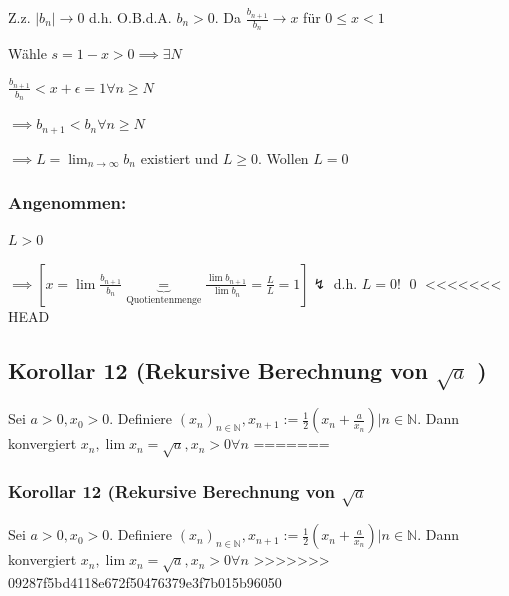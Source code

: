 \documentclass[fleqn]{scrbook}
\renewenvironment{proof}{{\bfseries Beweis }}{\qed}
\begin{document}
\begin{proof}
Z.z. $|b_n| \rightarrow 0$ d.h. O.B.d.A. $b_n > 0$. Da $\frac{b_{n+1}}{b_n} \rightarrow x$ für $0 \leq x < 1$

Wähle $s = 1 -x > 0 \implies \exists N$

$\frac{b_{n+1}}{b_n} < x + \epsilon = 1 \forall n \geq N$

$\implies b_{n+1} < b_n \forall n \geq N$

$\implies L = \lim_{n \rightarrow \infty} b_n$ existiert und $L \geq 0$. Wollen $L = 0$

\subsubsection{Angenommen:} $L>0$

$\implies [x = \lim \frac{b_{n+1}}{b_n} \underbrace{=}_{\text{Quotientenmenge}} \frac{\lim b_{n+1}}{\lim b_n} = \frac{L}{L} = 1] \lightning$ d.h. $L = 0$!
\end{proof}
<<<<<<< HEAD
\subsection{Korollar 12 (Rekursive Berechnung von $\sqrt{a}$ )} 
  Sei $a > 0, x_0 > 0$. Definiere $(x_n)_{n\in\mathbb{N}}, x_{n+1} := \frac{1}{2} (x_n+ \frac{a}{x_n}) | n\in\mathbb{N}$. 
  Dann konvergiert $x_n, \lim x_n = \sqrt{a}, x_n > 0 \forall n$
=======
\subsubsection{Korollar 12 (Rekursive Berechnung von \texorpdfstring{$\sqrt{a}$}{Wurzel a}} Sei $a > 0, x_0 > 0$. Definiere $(x_n)_{n\in\mathbb{N}}, x_{n+1} := \frac{1}{2} (x_n+ \frac{a}{x_n}) | n\in\mathbb{N}$. Dann konvergiert $x_n, \lim x_n = \sqrt{a}, x_n > 0 \forall n$
>>>>>>> 09287f5bd4118e672f50476379e3f7b015b96050
\end{document}
